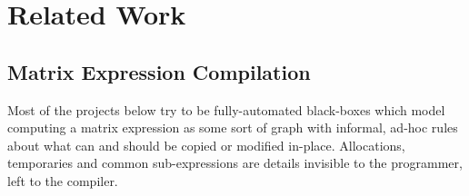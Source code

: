 \chapter{Related Work}\label{chap:related}

% 
% 
% 
% 

%

\section{Matrix Expression Compilation}\label{sec:mat_exp_comp}

Most of the projects below try to be fully-automated black-boxes which model
computing a matrix expression as some sort of graph with informal, ad-hoc rules
about what can and should be copied or modified in-place. Allocations,
temporaries and common sub-expressions are details invisible to the programmer,
left to the compiler.


